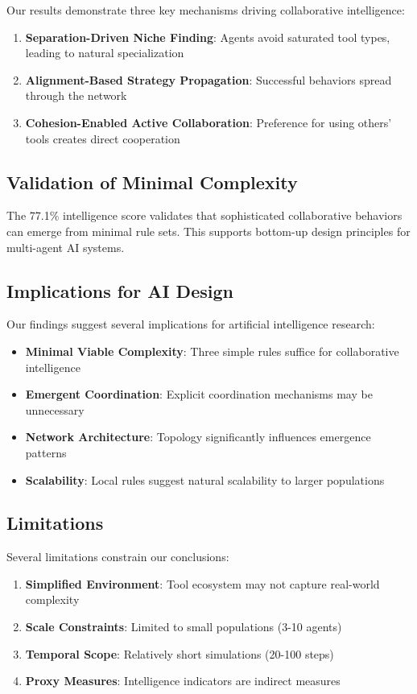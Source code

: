 \documentclass[10pt,twocolumn]{article}
\begin{document}
Our results demonstrate three key mechanisms driving collaborative intelligence:

\begin{enumerate}
\item \textbf{Separation-Driven Niche Finding}: Agents avoid saturated tool types, leading to natural specialization
\item \textbf{Alignment-Based Strategy Propagation}: Successful behaviors spread through the network
\item \textbf{Cohesion-Enabled Active Collaboration}: Preference for using others' tools creates direct cooperation
\end{enumerate}

\subsection{Validation of Minimal Complexity}

The 77.1\% intelligence score validates that sophisticated collaborative behaviors can emerge from minimal rule sets. This supports bottom-up design principles for multi-agent AI systems.

\subsection{Implications for AI Design}

Our findings suggest several implications for artificial intelligence research:

\begin{itemize}
\item \textbf{Minimal Viable Complexity}: Three simple rules suffice for collaborative intelligence
\item \textbf{Emergent Coordination}: Explicit coordination mechanisms may be unnecessary
\item \textbf{Network Architecture}: Topology significantly influences emergence patterns
\item \textbf{Scalability}: Local rules suggest natural scalability to larger populations
\end{itemize}

\subsection{Limitations}

Several limitations constrain our conclusions:

\begin{enumerate}
\item \textbf{Simplified Environment}: Tool ecosystem may not capture real-world complexity
\item \textbf{Scale Constraints}: Limited to small populations (3-10 agents)
\item \textbf{Temporal Scope}: Relatively short simulations (20-100 steps)
\item \textbf{Proxy Measures}: Intelligence indicators are indirect measures
\end{enumerate}
\end{document}

